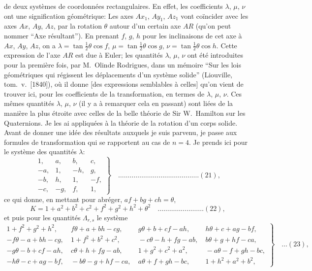 \documentclass[12pt,a4paper]{article}
\theoremstyle{plain}
\begin{document}
de deux syst\`emes de coordonn\'ees rectangulaires. En effet, les coefficients $\lambda$, $\mu$, $\nu$ ont une signification g\'eom\'etrique: Les axes $Ax_1$, $Ay_1$, $Az_1$ vont co\"incider avec les axes $Ax$, $Ay$, $Az$, par la rotation $\theta$ autour d'un certain axe $AR$ (qu'on peut nommer ``Axe r\'esultant''). En prenant $f$, $g$, $h$ pour les inclinaisons de cet axe \`a $Ax$, $Ay$, $Az$, on a $\lambda = \tan \frac{1}{2}\theta \cos f$, $\mu = \tan \frac{1}{2}\theta \cos g$, $\nu = \tan \frac{1}{2}\theta \cos h$. Cette expression de l'axe $AR$ est due \`a Euler; les quantit\'es $\lambda$, $\mu$, $\nu$ ont \'et\'e introduites pour la premi\`ere fois, par M.~Olinde Rodrigues, dans un m\'emoire ``Sur les lois g\'eom\'etriques qui r\'egissent les d\'eplacements d'un syst\`eme solide'' (Liouville, tom.~v.~[1840]), o\`u il donne [des expressions semblables \`a celles] qu'on vient de trouver ici, pour les coefficients de la transformation, en termes de $\lambda$, $\mu$, $\nu$. Ces m\^emes quantit\'es $\lambda$, $\mu$, $\nu$ (il y a \`a remarquer cela en passant) sont li\'ees de la mani\`ere la plus \'etroite avec celles de la belle th\'eorie de Sir W.~Hamilton sur les Quaternions. Je les ai appliqu\'ees \`a la th\'eorie de la rotation d'un corps solide. Avant de donner une id\'ee des r\'esultats auxquels je suis parvenu, je passe aux formules de transformation qui se rapportent au cas de $n = 4$. Je prends ici pour le syst\`eme des quantit\'es $\lambda$:
\[
\left. \begin{array}{rrrr}
1, & a, & b, & c, \\
-a, & 1, & -h, & g, \\
-b, & h, & 1, & -f, \\
-c, & -g, & f, & 1,
\end{array} \right\} \quad \ldots \ldots \ldots \ldots \ldots \ldots \ldots \ldots \ldots \ldots \ldots \ldots \ldots \ldots (21),
\]
ce qui donne, en mettant pour abr\'eger, $af + bg + ch = \theta$,
\[
K = 1 + a^2 + b^2 + c^2 + f^2 + g^2 + h^2 + \theta^2 \quad \ldots \ldots \ldots \ldots \ldots \ldots \ldots \ldots (22),
\]
et puis pour les quantit\'es $\Lambda_{r,s}$ le syst\`eme
{\small
\[
\left. \begin{aligned}
1 + f^2 + g^2 + h^2, &\ f\theta + a + bh - cg, &\ g\theta + b + cf - ah, &\ h\theta + c + ag - bf, \\
-f\theta - a + bh - cg, &\ 1 + f^2 + b^2 + c^2, &\ -c\theta - h + fg - ab, &\ b\theta + g + hf - ca, \\
-g\theta - b + cf - ah, &\ c\theta + h + fg - ab, &\ 1 + g^2 + c^2 + a^2, &\ -a\theta - f + gh - bc, \\
-h\theta - c + ag - bf, &\ -b\theta - g + hf - ca, &\ a\theta + f + gh - bc, &\ 1 + h^2 + a^2 + b^2,
\end{aligned} \right\} \quad \ldots (23),
\]
}
\end{document}
